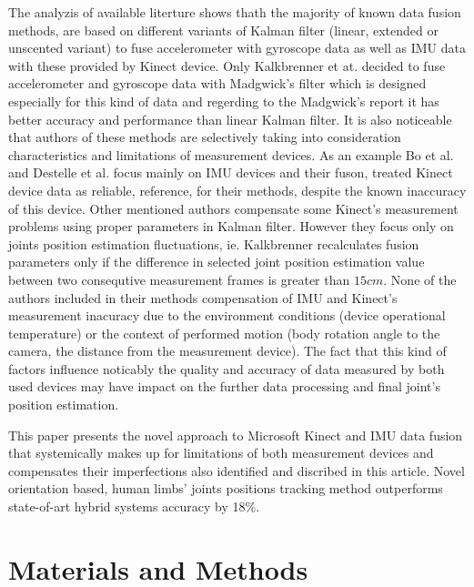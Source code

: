 \documentclass[sensors,article,submit,moreauthors,pdftex,10pt,a4paper]{mdpi}
\begin{document}
The analyzis of available literture shows thath the majority of known data fusion methods, are based on different variants of Kalman filter (linear, extended or unscented variant) to fuse accelerometer with gyroscope data as well as IMU data with these provided by Kinect device. Only Kalkbrenner et at. decided to fuse accelerometer and gyroscope data with Madgwick's filter which is designed especially for this kind of data and regerding to the Madgwick's report\cite{Madgwick2011} it has better accuracy and performance than linear Kalman filter. It is also noticeable that authors of these methods are selectively taking into consideration characteristics and limitations of measurement devices. As an example Bo et al. \cite{Bo2011a} and Destelle et al. \cite{Destelle2014} focus mainly on IMU devices and their fuson, treated Kinect device data as reliable, reference, for their methods, despite the known inaccuracy of this device. Other mentioned authors compensate some Kinect's measurement problems using proper parameters in Kalman filter. However they focus only on joints position estimation fluctuations, ie. Kalkbrenner recalculates fusion parameters only if the difference in selected joint position estimation value between two consequtive measurement frames is greater than $15cm$. None of the authors included in their methods compensation of IMU and Kinect's measurement inacuracy due to the environment conditions (device operational temperature) or the context of performed motion (body rotation angle to the camera, the distance from the measurement device). The fact that this kind of factors influence noticably the quality and accuracy of data measured by both used devices may have impact on the further data processing and final joint's position estimation.

This paper presents the novel approach to Microsoft Kinect and IMU data fusion that systemically makes up for limitations of both measurement devices and compensates their imperfections also identified and discribed in this article. Novel orientation based, human limbs’ joints positions tracking method outperforms state-of-art hybrid systems accuracy by 18\%.

\section{Materials and Methods}

\end{document}
